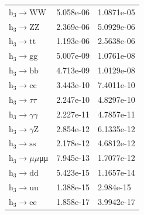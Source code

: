 \documentclass[12pt]{article}
\begin{document}
\begin{table}[htpb]
\begin{tabular}{lll}
			$\text{h}_3\to\text{WW}$   & 5.058e-06 & 1.0871e-05  \\
			$\text{h}_3\to\text{ZZ}$   & 2.369e-06 & 5.0929e-06  \\
			$\text{h}_3\to\text{tt}$   & 1.193e-06 & 2.5638e-06  \\
			$\text{h}_3\to\text{gg}$   & 5.007e-09 & 1.0761e-08  \\
			$\text{h}_3\to\text{bb}$   & 4.713e-09 & 1.0129e-08  \\
			$\text{h}_3\to\text{cc}$   & 3.443e-10 & 7.4011e-10  \\
			$\text{h}_3\to\tau\tau$   & 2.247e-10 & 4.8297e-10  \\
			$\text{h}_3\to\gamma\gamma$   & 2.227e-11 & 4.7857e-11  \\
			$\text{h}_3\to\gamma\text{Z}$   & 2.854e-12 & 6.1335e-12  \\
			$\text{h}_3\to\text{ss}$   & 2.178e-12 & 4.6812e-12  \\
			$\text{h}_3\to\mu\mu$μμ   & 7.945e-13 & 1.7077e-12  \\
			$\text{h}_3\to\text{dd}$   & 5.423e-15 & 1.1657e-14  \\
			$\text{h}_3\to\text{uu}$   & 1.388e-15 & 2.984e-15   \\
			$\text{h}_3\to\text{ee}$   & 1.858e-17 & 3.9942e-17 
		\end{tabular}	
	\end{table}
\end{document}
